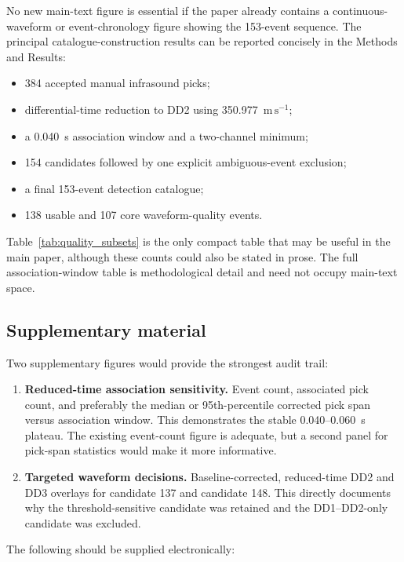\documentclass[11pt]{article}
\begin{document}
No new main-text figure is essential if the paper already contains a
continuous-waveform or event-chronology figure showing the 153-event sequence.
The principal catalogue-construction results can be reported concisely in the
Methods and Results:

\begin{itemize}
\item 384 accepted manual infrasound picks;
\item differential-time reduction to DD2 using 350.977~\(\mathrm{m\,s^{-1}}\);
\item a 0.040~s association window and a two-channel minimum;
\item 154 candidates followed by one explicit ambiguous-event exclusion;
\item a final 153-event detection catalogue;
\item 138 usable and 107 core waveform-quality events.
\end{itemize}

Table~\ref{tab:quality_subsets} is the only compact table that may be useful in
the main paper, although these counts could also be stated in prose. The full
association-window table is methodological detail and need not occupy main-text
space.

\subsection{Supplementary material}

Two supplementary figures would provide the strongest audit trail:

\begin{enumerate}
\item \textbf{Reduced-time association sensitivity.} Event count, associated
pick count, and preferably the median or 95th-percentile corrected pick span
versus association window. This demonstrates the stable 0.040--0.060~s
plateau. The existing event-count figure is adequate, but a second panel for
pick-span statistics would make it more informative.
\item \textbf{Targeted waveform decisions.} Baseline-corrected, reduced-time
DD2 and DD3 overlays for candidate 137 and candidate 148. This directly
documents why the threshold-sensitive candidate was retained and the
DD1--DD2-only candidate was excluded.
\end{enumerate}

The following should be supplied electronically:
\end{document}
